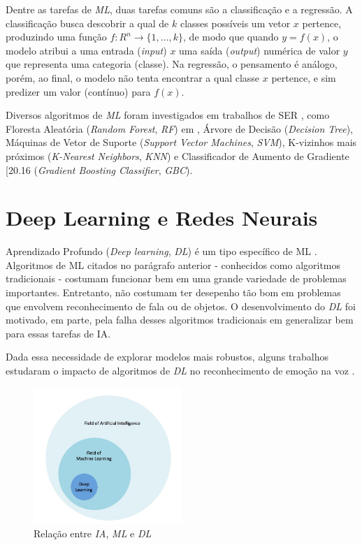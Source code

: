 Dentre as tarefas de \textit{ML}, duas tarefas comuns são a classificação e a regressão. A classificação busca descobrir a qual de $k$ classes possíveis um vetor $x$ pertence, produzindo uma função $f: R^n \rightarrow \{1, ..., k\}$, de modo que quando $y = f(x)$, o modelo atribui a uma entrada (\textit{input}) $x$ uma saída (\textit{output}) numérica de valor $y$ que representa uma categoria (classe). Na regressão, o pensamento é análogo, porém, ao final, o modelo não tenta encontrar a qual classe $x$ pertence, e sim predizer um valor (contínuo) para $f(x)$.

Diversos algoritmos de \textit{ML} foram investigados em trabalhos de SER \cite{20.7}, como Floresta Aleatória (\textit{Random Forest}, \textit{RF}) em \cite{20.10}, Árvore de Decisão \cite{20.11} (\textit{Decision Tree}), Máquinas de Vetor de Suporte \cite{20.13} (\textit{Support Vector Machines}, \textit{SVM}), K-vizinhos mais próximos \cite{20.15} (\textit{K-Nearest Neighbors}, \textit{KNN}) e Classificador de Aumento de Gradiente [20.16 (\textit{Gradient Boosting Classifier}, \textit{GBC}).

\section{Deep Learning e Redes Neurais}

Aprendizado Profundo (\textit{Deep learning}, \textit{DL}) é um tipo específico de ML \cite{53}. Algoritmos de ML citados no parágrafo anterior - conhecidos como algoritmos tradicionais - costumam funcionar bem em uma grande variedade de problemas importantes. Entretanto, não costumam ter desepenho tão bom em problemas que envolvem reconhecimento de fala ou de objetos. O desenvolvimento do \textit{DL} foi motivado, em parte, pela falha desses algoritmos tradicionais em generalizar bem para essas tarefas de IA.

Dada essa necessidade de explorar modelos mais robustos, alguns trabalhos estudaram o impacto de algoritmos de \textit{DL} no reconhecimento de emoção na voz \cite{12.12} \cite{12.16}.

\begin{figure}[!h]
\centering
\includegraphics[width=0.5\textwidth]{imagens/ia-ml-dl.JPG}
\caption{\label{fig:ia-ml-dl}Relação entre \textit{IA}, \textit{ML} e \textit{DL}}

\author{Fonte: Retirada de \cite{58}}
\end{figure}


